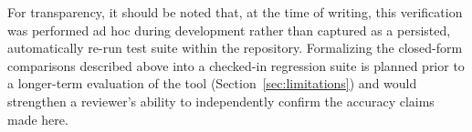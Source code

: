 For transparency, it should be noted that, at the time of writing, this verification was
performed ad hoc during development rather than captured as a persisted, automatically
re-run test suite within the repository. Formalizing the closed-form comparisons described
above into a checked-in regression suite is planned prior to a longer-term evaluation of the
tool (Section~\ref{sec:limitations}) and would strengthen a reviewer's ability to
independently confirm the accuracy claims made here.
